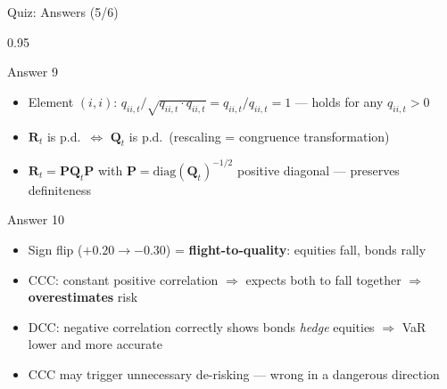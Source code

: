 \documentclass[9pt, aspectratio=169, t]{beamer}
\begin{document}
\begin{frame}{Quiz: Answers (5/6)}
    \begin{cminipage}{0.95\textwidth}
    {\scriptsize
    \begin{exampleblock}{Answer 9}
        \begin{itemize}\setlength{\itemsep}{0pt}
            \item Element $(i,i)$: $q_{ii,t}/\sqrt{q_{ii,t} \cdot q_{ii,t}} = q_{ii,t}/q_{ii,t} = 1$ --- holds for any $q_{ii,t} > 0$
            \item $\mathbf{R}_t$ is p.d.\ $\Leftrightarrow$ $\mathbf{Q}_t$ is p.d.\ (rescaling = congruence transformation)
            \item $\mathbf{R}_t = \mathbf{P}\mathbf{Q}_t\mathbf{P}$ with $\mathbf{P} = \text{diag}(\mathbf{Q}_t)^{-1/2}$ positive diagonal --- preserves definiteness
        \end{itemize}
    \end{exampleblock}
    \begin{exampleblock}{Answer 10}
        \begin{itemize}\setlength{\itemsep}{0pt}
            \item Sign flip ($+0.20 \to -0.30$) = \textbf{flight-to-quality}: equities fall, bonds rally
            \item CCC: constant positive correlation $\Rightarrow$ expects both to fall together $\Rightarrow$ \textbf{overestimates} risk
            \item DCC: negative correlation correctly shows bonds \textit{hedge} equities $\Rightarrow$ VaR lower and more accurate
            \item CCC may trigger unnecessary de-risking --- wrong in a dangerous direction
        \end{itemize}
    \end{exampleblock}
    }
    \end{cminipage}
\end{frame}
\end{document}
